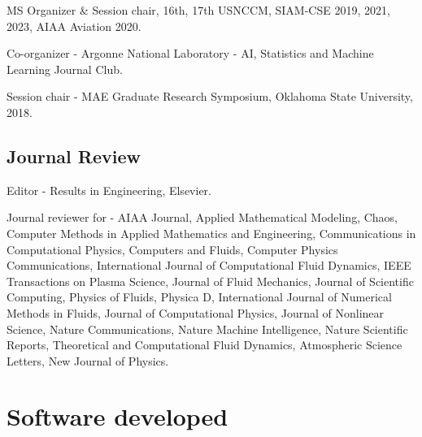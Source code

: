 \documentclass[letterpaper]{article}
\renewenvironment{itemize}{
  \begin{list}{}{
    \setlength{\leftmargin}{1.5em}
  }
}{
  \end{list}
}
\begin{document}
\begin{itemize}
  \item MS Organizer \& Session chair, 16th, 17th USNCCM, SIAM-CSE 2019, 2021, 2023, AIAA Aviation 2020.
  \item Co-organizer - Argonne National Laboratory - AI, Statistics and Machine Learning Journal Club.
  \item Session chair - MAE Graduate Research Symposium, Oklahoma State University, 2018.
\end{itemize}

\subsection*{Journal Review}

\begin{itemize}
  \item Editor - Results in Engineering, Elsevier.
  \item Journal reviewer for - AIAA Journal, Applied Mathematical Modeling, Chaos, Computer Methods in Applied Mathematics and Engineering, Communications in Computational Physics, Computers and Fluids, Computer Physics Communications, International Journal of Computational Fluid Dynamics, IEEE Transactions on Plasma Science, Journal of Fluid Mechanics, Journal of Scientific Computing, Physics of Fluids, Physica D, International Journal of Numerical Methods in Fluids, Journal of Computational Physics, Journal of Nonlinear Science, Nature Communications, Nature Machine Intelligence, Nature Scientific Reports, Theoretical and Computational Fluid Dynamics, Atmospheric Science Letters, New Journal of Physics.
\end{itemize}

\section*{Software developed}
\end{document}
